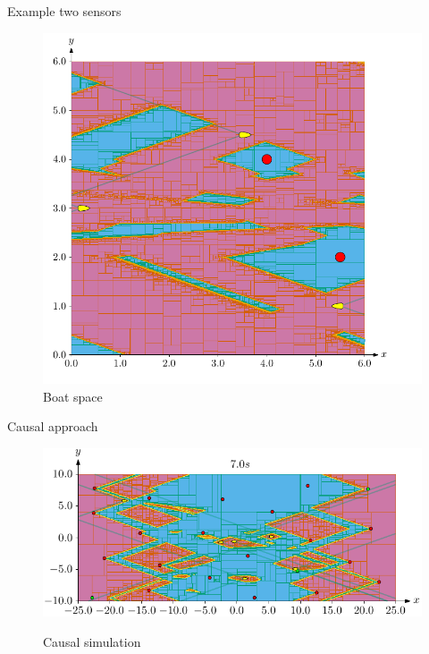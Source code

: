 \documentclass{beamer}
\begin{document}
\begin{frame}{Example two sensors}
\begin{minipage}{0.45\textwidth}
\begin{figure}
                        \includegraphics[width=\textwidth]{imgs/ex_boat_space}
                        \caption{Boat space}
                \end{figure}
            \end{minipage}
        \end{frame}

        \begin{frame}{Causal approach}
            \begin{figure}
                \centering
                \href{run:causal.mp4?autostart}{\includegraphics[width=\textwidth]{imgs/causal_cover}}
                \caption{Causal simulation}
            \end{figure}
        \end{frame}
\end{document}
